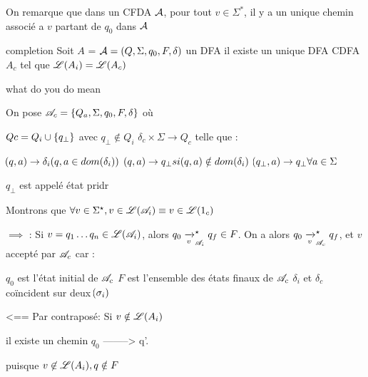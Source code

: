 \documentclass[a4paper,french,bookmarks]{book}
\begin{document}
    
    On remarque que dans un CFDA $\mathcal{A}$, pour tout $v\in \Sigma^*$, il y a un unique chemin associé a $v$ partant de $q_0$ dans $\mathcal{A}$
    
    \begin{theorem}{completion}
        Soit $A$ = $\mathcal{A} = (Q,\Sigma, q_0, F, \delta)$ un DFA 
        il existe un unique DFA CDFA $A_c$ tel que $\mathscr{L}(A_i) = \mathscr{L}(A_c) $
        
        what do you do mean  
             
                
        
    \end{theorem}  
    
    \begin{nproof}
        On pose $\mathscr{A}_c = \left\{Q_a, \Sigma, q_0, F, \delta\right\}$ où
        \begin{enumerate}
            \itt $Qc = Q_i \cup \left\{q_\bot\right\}$ avec $q_\bot \notin Q_i$
            \itt $\delta_c \times \Sigma \to Q_c$ telle que :
            \begin{enumerate}
                \itt $\!\left(q, a\right) \to \delta_i \!\left(q, a \in dom \!\left(\delta_i\right)\right)$ %
                \itt $(q, a) \to q_\bot si \!\left(q, a\right) \notin dom \!\left(\delta_i\right)$
                \itt $\!\left(q_\bot, a\right) \to q_\bot \forall a \in \Sigma$
            \end{enumerate}
            
        \end{enumerate}
        $q_\bot$ est appelé état pridr
        
        Montrons que $\forall v \in \Sigma^\star, v \in \mathscr{L} \!\left(\mathscr{A}_i\right) \equiv v \in \mathscr{L} \!\left(1_c\right)$
        
        $\implies$ : Si $v = q_1 \dots q_n \in \mathscr{L} \!\left(\mathscr{A}_i\right)$, alors $q_0 \lima{v}_{\bsA_i}^\star q_f \in F$. On a alors $q_0 \lima{v}_{\bsA_c}^\star q_f$, et $v$ accepté par $\mathscr{A}_c$ car :
        \begin{enumerate}
            \itt $q_0$ est l'état initial de $\mathscr{A}_c$
            \itt $F$ est l'ensemble des états finaux de $\mathscr{A}_c$
            \itt $\delta_i$ et $\delta_c$ coïncident sur deux $\!\left(\sigma_i\right)$
        \end{enumerate}
        
        
        <==
        Par contraposé: Si $v \notin \mathscr{L}(A_i) $
        \begin{enumerate}
            \itt il existe un chemin $q_0$ --------> q'. 
        
            puisque $v \not \in \mathscr{L}(A_i), q \notin F $
            

\end{enumerate}
\end{nproof}
\end{document}
